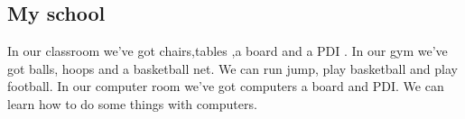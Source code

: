 \subsection*{My school}

In our classroom we’ve got chairs,tables ,a board and a PDI .
In our gym we’ve got balls, hoops and a basketball net. We can run  jump, play basketball and play football.
In our computer room we’ve got computers a board and PDI. We can learn how to do some things with computers.


